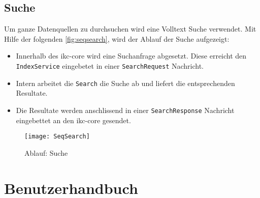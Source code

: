 \subsection{Suche}

Um ganze Datenquellen zu durchsuchen wird eine Volltext Suche verwendet. Mit Hilfe der folgenden \autoref{fig:seqsearch}, wird der Ablauf der Suche aufgezeigt:
\begin{itemize}
    \item Innerhalb des \gls{ikc-core} wird eine Suchanfrage abgesetzt. Diese erreicht den \texttt{IndexService} eingebetet in einer \texttt{SearchRequest} Nachricht. 
    \item Intern arbeitet die \texttt{Search} die Suche ab und liefert die entsprechenden Resultate.
    \item Die Resultate werden anschlissend in einer \texttt{SearchResponse} Nachricht eingebettet an den \gls{ikc-core} gesendet.
\end{itemize}

    \begin{figure}[H]
    \centering
    \texttt{[image: SeqSearch]}
    \caption{Ablauf: Suche}
    \label{fig:seqsearch}
    \end{figure}
    




\section{Benutzerhandbuch}
